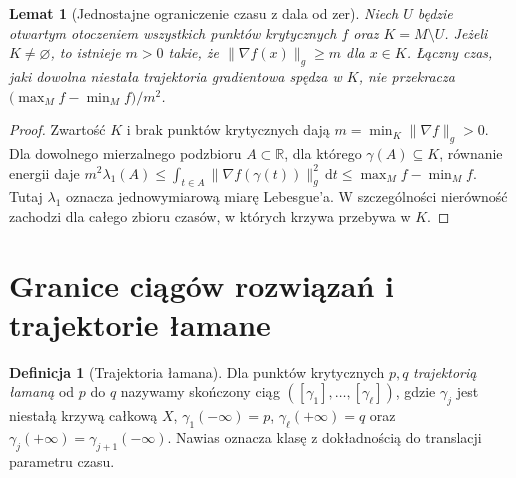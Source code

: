 \documentclass[11pt,a4paper,oneside]{report}
\newcommand{\R}{\mathbb{R}}
\newcommand{\dd}{\mathrm d}
\theoremstyle{plain}
\newtheorem{lemat}[twierdzenie]{Lemat}
\theoremstyle{definition}
\newtheorem{definicja}[twierdzenie]{Definicja}
\theoremstyle{remark}
\begin{document}
\begin{lemat}[Jednostajne ograniczenie czasu z dala od zer]
\label{lem:morse-transit-v11}
Niech $U$ będzie otwartym otoczeniem wszystkich punktów
krytycznych $f$ oraz $K=M\setminus U$.
Jeżeli $K\ne\varnothing$, to istnieje $m>0$ takie, że
$\|\nabla f(x)\|_g\ge m$ dla $x\in K$.
Łączny czas, jaki dowolna niestała trajektoria gradientowa
spędza w $K$, nie przekracza
$\bigl(\max_M f-\min_M f\bigr)/m^2$.
\end{lemat}
\begin{proof}
Zwartość $K$ i brak punktów krytycznych dają
$m=\min_K\|\nabla f\|_g>0$.
Dla dowolnego mierzalnego podzbioru $A\subset\R$, dla którego
$\gamma(A)\subseteq K$, równanie energii daje
$m^2\lambda_1(A)\le\int_{t\in A}\|\nabla f(\gamma(t))\|_g^2\,\dd t
\le\max_Mf-\min_Mf$.
Tutaj $\lambda_1$ oznacza jednowymiarową miarę Lebesgue'a.
W szczególności nierówność zachodzi dla całego zbioru czasów,
w których krzywa przebywa w $K$.
\end{proof}

\section{Granice ciągów rozwiązań i trajektorie łamane}
\begin{definicja}[Trajektoria łamana]
\label{def:broken-morse-v11}
Dla punktów krytycznych $p,q$ \emph{trajektorią łamaną}
od $p$ do $q$ nazywamy skończony ciąg
$([\gamma_1],\ldots,[\gamma_\ell])$,
gdzie $\gamma_j$ jest niestałą krzywą całkową $X$,
$\gamma_1(-\infty)=p$, $\gamma_\ell(+\infty)=q$ oraz
$\gamma_j(+\infty)=\gamma_{j+1}(-\infty)$.
Nawias oznacza klasę z dokładnością do translacji parametru czasu.
\end{definicja}
\end{document}
